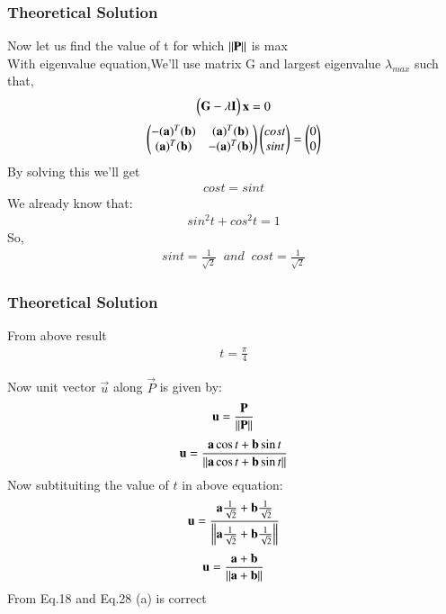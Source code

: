 \documentclass{beamer}
\begin{document}
\begin{frame}
\frametitle{Theoretical Solution}
    Now let us find the value of t for which $\norm{\Vec{P}}$ is max\\
With eigenvalue equation,We'll use matrix G and largest eigenvalue $\lambda_{max}$ such that,
\begin{align}
    \myvec{\Vec{G}-\lambda \Vec{I}}\Vec{x}=0
\end{align}
\begin{align}
    \myvec{-(\Vec{a})^T(\Vec{b})&(\Vec{a})^T(\Vec{b})\\(\Vec{a})^T(\Vec{b})&-(\Vec{a})^T(\Vec{b})}\myvec{cost\\sint}=\myvec{0\\0}
\end{align}
By solving this we'll get 
\begin{align}
    cost=sint
\end{align}
We already know that:
\begin{align}
    sin^2t+cos^2t=1
\end{align}
So,
\begin{align}
    sint=\frac{1}{\sqrt{2}}\;\;and\;\; cost=\frac{1}{\sqrt{2}}
\end{align}

\end{frame}

\begin{frame}
\frametitle{Theoretical Solution}
    From above result
\begin{align}
    t=\frac{\pi}{4}
\end{align}

Now unit vector $\Vec{u}$ along $\Vec{P}$ is given by:
\begin{align}
    \Vec{{\Vec{u}}}=\frac{\Vec{P}}{\norm{\Vec{P}}}
\end{align}
\begin{align}
\Vec{\Vec{u}}=\frac{\vec{a}\cos{t} + \vec{b}\sin{t}}{\norm{\vec{a}\cos{t} + \vec{b}\sin{t}}}
\end{align}
Now subtituiting the value of $t$ in above equation:
\begin{align}
    \Vec{u}=\frac{\Vec{a}\frac{1}{\sqrt{2}} + \Vec{b}\frac{1}{\sqrt{2}}}{\norm{\Vec{a}\frac{1}{\sqrt{2}} + \Vec{b}\frac{1}{\sqrt{2}}}}
\end{align}
\begin{align}
    \Vec{u}=\frac{\Vec{a} + \Vec{b}}{\norm{\Vec{a} + \Vec{b}}}
\end{align}
From Eq.18 and Eq.28 (a) is correct
\end{frame}
\end{document}
